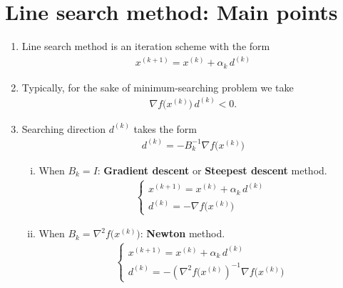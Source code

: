\documentclass[12pt]{article}
\begin{document}
\section{Line search method: Main points}
\begin{mdframed}
	\begin{enumerate}
		\item Line search method is an iteration scheme with the form
		      \begin{align}
			      x^{(k+1)} = x^{(k)} + \alpha_k \, d^{(k)}
		      \end{align}
		      
		\item Typically, for the sake of minimum-searching problem we take
		      \begin{align}
			      \nabla f \Big( x^{(k)} \Big) \, d^{(k)} < 0.
		      \end{align}
		      
		\item Searching direction  $d^{(k)}$ takes the form
		      \begin{align}
			      d^{(k)} = - B^{-1}_k \nabla f \Big( x^{(k)} \Big)
		      \end{align}
		      
		      \begin{enumerate}[(i)]
			      \item When $B_k = I$: \textbf{Gradient descent} or
			            \textbf{Steepest descent} method.
			            \begin{align}
				            \begin{cases}
					            x^{(k+1)} = x^{(k)} + \alpha_k \, d^{(k)} \\
					            d^{(k)} = - \nabla f \Big( x^{(k)} \Big)
				            \end{cases}
			            \end{align}
			            
			      \item When $B_k = \nabla^2 f \Big( x^{(k)} \Big)$: \textbf{Newton} method.
			            \begin{align}
				            \begin{cases}
					            x^{(k+1)} = x^{(k)} + \alpha_k \, d^{(k)} \\
					            d^{(k)} = - \left( \nabla^2 f \Big( x^{(k)} \right)^{-1} \nabla f \Big( x^{(k)} \Big)
				            \end{cases}
			            \end{align}
			            

\end{enumerate}
\end{enumerate}
\end{mdframed}
\end{document}
